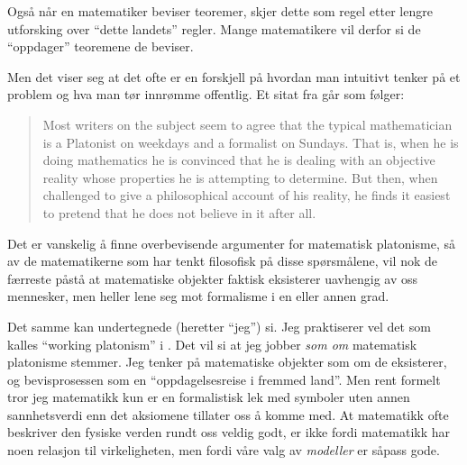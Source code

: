 \documentclass[12pt, norsk]{article}
\begin{document}
Også når en matematiker beviser teoremer, skjer dette som regel etter lengre utforsking over ``dette landets'' regler. Mange matematikere vil derfor si de ``oppdager'' teoremene de beviser.

Men det viser seg at det ofte er en forskjell på hvordan man intuitivt tenker på et problem og hva man tør innrømme offentlig. Et sitat fra \cite[side 359]{mathematical_experience} går som følger: 

\begin{quote}
Most writers on the subject seem to agree that the typical mathematician is a Platonist on weekdays and a formalist on Sundays. That is, when he is doing mathematics he is convinced that he is dealing with an objective reality whose properties he is attempting to determine. But then, when challenged to give a philosophical account of his reality, he finds it easiest to pretend that he does not believe in it after all.
\end{quote}

Det er vanskelig å finne overbevisende argumenter for matematisk platonisme, så av de matematikerne som har tenkt filosofisk på disse spørsmålene, vil nok de færreste påstå at matematiske objekter faktisk eksisterer uavhengig av oss mennesker, men heller lene seg mot formalisme i en eller annen grad.

Det samme kan undertegnede (heretter ``jeg'') si. Jeg praktiserer vel det som kalles ``working platonism'' i \cite{linnebo_artikkel}. Det vil si at jeg jobber \emph{som om} matematisk platonisme stemmer. Jeg tenker på matematiske objekter som om de eksisterer, og bevisprosessen som en ``oppdagelsesreise i fremmed land''. Men rent formelt tror jeg matematikk kun er en formalistisk lek med symboler uten annen sannhetsverdi enn det aksiomene tillater oss å komme med. At matematikk ofte beskriver den fysiske verden rundt oss veldig godt, er ikke fordi matematikk har noen relasjon til virkeligheten, men fordi våre valg av \emph{modeller} er såpass gode.


 

\end{document}
